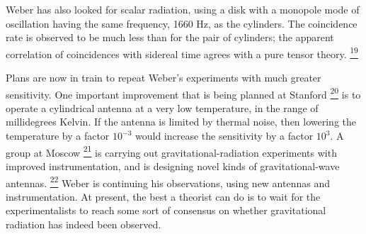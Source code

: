 Weber has also looked for scalar radiation, using a disk with a monopole mode
of oscillation having the same frequency, 1660 Hz, as the cylinders. The
coincidence rate is observed to be much less than for the pair of cylinders;
the apparent correlation of coincidences with sidereal time agrees with a pure
tensor theory.%
\hyperref[ch10-ref-19]{\textsuperscript{19}}



Plans are now in train to repeat Weber's experiments with much greater
sensitivity. One important improvement that is being planned at Stanford%
\hyperref[ch10-ref-20]{\textsuperscript{20}}
is to operate a cylindrical antenna at a very low temperature, in the range of
millidegrees Kelvin. If the antenna is limited by thermal noise, then lowering
the temperature by a factor \(10^{-3}\) would increase the sensitivity by a
factor \(10^3\). A group at Moscow%
\hyperref[ch10-ref-21]{\textsuperscript{21}}
is carrying out gravitational-radiation experiments with improved
instrumentation, and is designing novel kinds of gravitational-wave
antennas.%
\hyperref[ch10-ref-22]{\textsuperscript{22}}
Weber is continuing his observations, using new antennas and instrumentation.
At present, the best a theorist can do is to wait for the experimentalists to
reach some sort of consensus on whether gravitational radiation has indeed
been observed.
